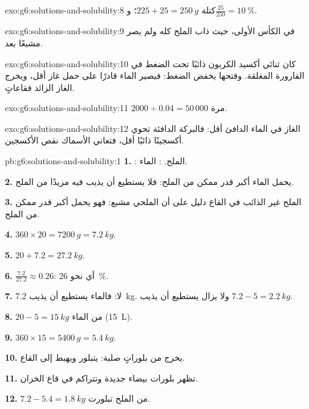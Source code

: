 \begin{solution}{exo:g6:solutions-and-solubility:8}
كتلة  $225 + 25 = \qty{250}{g}$؛ و$\frac{25}{250} =
\qty{10}{\percent}$.
\end{solution}

\begin{solution}{exo:g6:solutions-and-solubility:9}
في الكأس الأولى، حيث ذاب الملح كله ولم يصر  مشبعًا
بعد.
\end{solution}

\begin{solution}{exo:g6:solutions-and-solubility:10}
كان ثنائي أكسيد الكربون ذائبًا تحت الضغط في القارورة المغلقة. وفتحها
يخفض الضغط: فيصير الماء قادرًا على حمل غاز أقل، ويخرج الغاز الزائد
فقاعاتٍ.
\end{solution}

\begin{solution}{exo:g6:solutions-and-solubility:11}
$2000 \div 0.04 = 50\,000$ مرة.
\end{solution}

\begin{solution}{exo:g6:solutions-and-solubility:12}
الغاز  في الماء الدافئ أقل: فالبركة الدافئة تحوي أكسجينًا ذائبًا أقل،
فتعاني الأسماك نقص الأكسجين.
\end{solution}

\begin{solution}{pb:g6:solutions-and-solubility:1}
\textbf{1.} : الملح. : الماء.

\textbf{2.} يحمل الماء أكبر قدر ممكن من الملح: فلا يستطيع أن يذيب فيه
مزيدًا من الملح.

\textbf{3.} الملح غير الذائب في القاع دليل على أن  الملحي مشبع:
فهو يحمل أكبر قدر ممكن من الملح.

\textbf{4.} $360 \times 20 = \qty{7200}{g} = \qty{7.2}{kg}$.

\textbf{5.} $20 + 7.2 = \qty{27.2}{kg}$.

\textbf{6.} $\frac{7.2}{27.2} \approx 0.26$: أي نحو \qty{26}{\percent}.

\textbf{7.} لا: فالماء يستطيع أن يذيب \qty{7.2}{kg}. ولا يزال يستطيع أن
يذيب $7.2 - 5 = \qty{2.2}{kg}$.

\textbf{8.} $20 - 5 = \qty{15}{kg}$ من الماء (\qty{15}{L}).

\textbf{9.} $360 \times 15 = \qty{5400}{g} = \qty{5.4}{kg}$.

\textbf{10.} يخرج من  بلوراتٍ صلبة: يتبلور ويهبط إلى
القاع.

\textbf{11.} تظهر بلورات بيضاء جديدة وتتراكم في قاع
الخزان.

\textbf{12.} $7.2 - 5.4 = \qty{1.8}{kg}$ من الملح تبلورت.
\end{solution}
